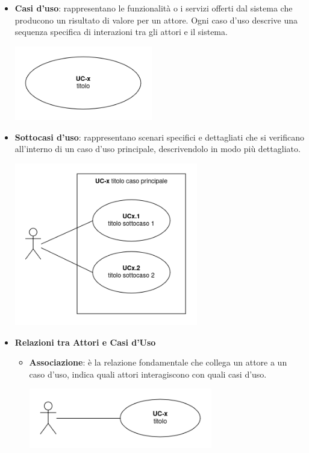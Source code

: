\begin{itemize}
\begin{center}
	      \end{center}
	\item \textbf{Casi d'uso}: rappresentano le funzionalità o i servizi offerti dal sistema che producono un risultato di valore per un attore. Ogni caso d'uso descrive una sequenza specifica di interazioni tra gli attori e il sistema.
	      \begin{center}
		      \includegraphics*[width=6cm]{../../../images/norme_di_progetto/uc.png}
	      \end{center}
	\item \textbf{Sottocasi d'uso}: rappresentano scenari specifici e dettagliati che si verificano all'interno di un caso d'uso principale, descrivendolo in modo più dettagliato.
	      \begin{center}
		      \includegraphics*[width=8cm]{../../../images/norme_di_progetto/sottocasi.png}
	      \end{center}

	\item \textbf{Relazioni tra Attori e Casi d'Uso}
	      \begin{itemize}
		      \item \textbf{Associazione}: è la relazione fondamentale che collega un attore a un caso d'uso, indica quali attori interagiscono con quali casi d'uso.
		            \begin{center}
			            \includegraphics*[width=8cm]{../../../images/norme_di_progetto/associazione.png}
		            \end{center}
	      \end{itemize}


\end{itemize}
